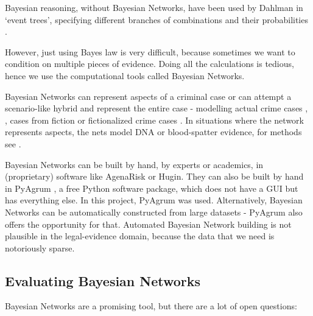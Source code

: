 Bayesian reasoning, without Bayesian Networks, have been used by Dahlman in `event trees', specifying different branches of combinations and their probabilities \citep{dahlman2020}.

However, just using Bayes law is very difficult, because sometimes we want to condition on multiple pieces of evidence. Doing all the calculations is tedious, hence we use the computational tools called Bayesian Networks. 

Bayesian Networks can represent aspects of a criminal case or can attempt a scenario-like hybrid and represent the entire case - modelling actual crime cases \citep{Kadane1996}, \citep{Fenton2019},  cases from fiction \citep{Fenton2012} or fictionalized crime cases \citep{vanLeeuwen2019}. In situations where the network represents aspects, the nets model DNA or blood-spatter evidence, for methods see \citep{Meester2021}. 

Bayesian Networks can be built by hand, by experts or academics, in (proprietary) software like AgenaRisk or Hugin. They can also be built by hand in PyAgrum \citep{pyagrum2020}, a free Python software package, which does not have a GUI but has everything else. In this project, PyAgrum was used. Alternatively, Bayesian Networks can be automatically constructed from large datasets - PyAgrum also offers the opportunity for that. Automated Bayesian Network building is not plausible in the legal-evidence domain, because the data that we need is notoriously sparse.

\subsection{Evaluating Bayesian Networks}

Bayesian Networks are a promising tool, but there are a lot of open questions:

